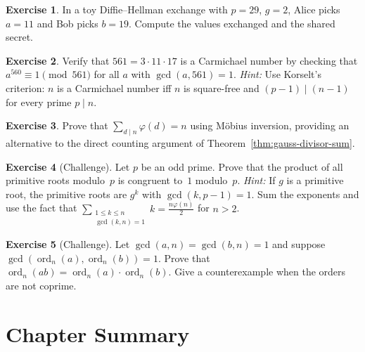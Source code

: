 \documentclass[12pt,a4paper,openany]{book}
\theoremstyle{definition}
\newtheorem{exercise}{Exercise}[chapter]
\theoremstyle{plain}
\theoremstyle{remark}
\DeclareMathOperator{\ord}{ord}
\begin{document}
\begin{exercise}
\label{exer:dh-1}
In a toy Diffie--Hellman exchange with $p = 29$, $g = 2$, Alice picks
$a = 11$ and Bob picks $b = 19$.  Compute the values exchanged and the
shared secret.
\end{exercise}

\begin{exercise}
\label{exer:carmichael}
Verify that $561 = 3 \cdot 11 \cdot 17$ is a Carmichael number by
checking that $a^{560} \equiv 1 \pmod{561}$ for all $a$ with
$\gcd(a, 561) = 1$.
\textit{Hint:} Use Korselt's criterion: $n$ is a Carmichael number iff
$n$ is square-free and $(p-1) \mid (n-1)$ for every prime $p \mid n$.
\end{exercise}

\begin{exercise}
\label{exer:sum-totient}
Prove that $\sum_{d \mid n} \varphi(d) = n$ using Möbius
inversion, providing an alternative to the
direct counting argument of Theorem~\ref{thm:gauss-divisor-sum}.
\end{exercise}

\begin{exercise}[Challenge]
\label{exer:prim-root-product}
Let $p$ be an odd prime.  Prove that the product of all primitive roots
modulo~$p$ is congruent to~$1$ modulo~$p$.
\textit{Hint:} If $g$ is a primitive root, the primitive roots are $g^k$
with $\gcd(k, p-1) = 1$.  Sum the exponents and use the fact that
$\sum_{\substack{1 \le k \le n \\ \gcd(k,n)=1}} k = \frac{n \varphi(n)}{2}$
for $n > 2$.
\end{exercise}

\begin{exercise}[Challenge]
\label{exer:order-lcm}
Let $\gcd(a,n) = \gcd(b,n) = 1$ and suppose $\gcd(\ord_n(a), \ord_n(b)) = 1$.
Prove that $\ord_n(ab) = \ord_n(a) \cdot \ord_n(b)$.  Give a counterexample
when the orders are not coprime.
\end{exercise}

\section{Chapter Summary}
\label{sec:ch4-summary}
\end{document}
